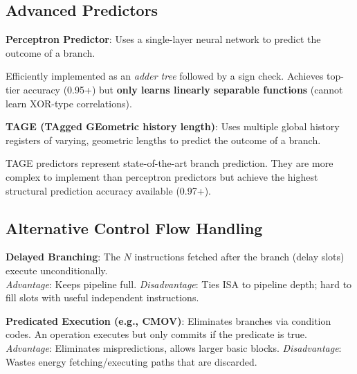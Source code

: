 \subsection{Advanced Predictors}

\begin{definition}
    \textbf{Perceptron Predictor}: Uses a single-layer neural network to predict the outcome of a branch.
\end{definition}

\begin{remark}
    Efficiently implemented as an \textit{adder tree} followed by a sign check. Achieves top-tier accuracy (0.95+) but \textbf{only learns linearly separable functions} (cannot learn XOR-type correlations).
\end{remark}

\begin{definition}
    \textbf{TAGE (TAgged GEometric history length)}: Uses multiple global history registers of varying, geometric lengths to predict the outcome of a branch.
\end{definition}

\begin{remark}
    TAGE predictors represent state-of-the-art branch prediction. They are more complex to implement than perceptron predictors but achieve the highest structural prediction accuracy available (0.97+).
\end{remark}

\subsection{Alternative Control Flow Handling}

\begin{definition}
    \textbf{Delayed Branching}: The $N$ instructions fetched after the branch (delay slots) execute unconditionally. \\
    \textit{Advantage}: Keeps pipeline full. \textit{Disadvantage}: Ties ISA to pipeline depth; hard to fill slots with useful independent instructions.
\end{definition}

\begin{definition}
    \textbf{Predicated Execution (e.g., CMOV)}: Eliminates branches via condition codes. An operation executes but only commits if the predicate is true.\\
    \textit{Advantage}: Eliminates mispredictions, allows larger basic blocks. \textit{Disadvantage}: Wastes energy fetching/executing paths that are discarded.
\end{definition}